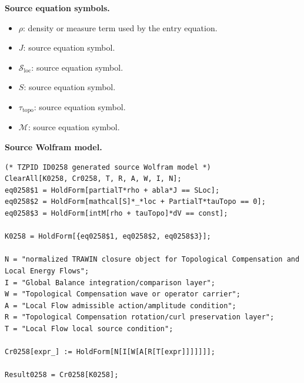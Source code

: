\begin{minipage}[t]{0.49\linewidth}
\begingroup
\small
\raggedright
\textbf{Source equation symbols.}\par
\begin{itemize}[leftmargin=1.35em,itemsep=1pt,topsep=1pt,parsep=0pt]
    \item $\rho$: density or measure term used by the entry equation.
    \item $J$: source equation symbol.
    \item $\mathcal{S}_{\mathrm{loc}}$: source equation symbol.
    \item $S$: source equation symbol.
    \item $\tau_{\mathrm{topo}}$: source equation symbol.
    \item $\mathcal{M}$: source equation symbol.
\end{itemize}
\endgroup
\end{minipage}\hfill
\begin{minipage}[t]{0.47\linewidth}
\begingroup
\scriptsize
\raggedright
\textbf{Source Wolfram model.}\par
\begin{Verbatim}[fontsize=\tiny,breaklines=true,breakanywhere=true]
(* TZPID ID0258 generated source Wolfram model *)
ClearAll[K0258, Cr0258, T, R, A, W, I, N];
eq0258$1 = HoldForm[partialT*rho + abla*J == SLoc];
eq0258$2 = HoldForm[mathcal[S]*_*loc + PartialT*tauTopo == 0];
eq0258$3 = HoldForm[intM[rho + tauTopo]*dV == const];

K0258 = HoldForm[{eq0258$1, eq0258$2, eq0258$3}];

N = "normalized TRAWIN closure object for Topological Compensation and Local Energy Flows";
I = "Global Balance integration/comparison layer";
W = "Topological Compensation wave or operator carrier";
A = "Local Flow admissible action/amplitude condition";
R = "Topological Compensation rotation/curl preservation layer";
T = "Local Flow local source condition";

Cr0258[expr_] := HoldForm[N[I[W[A[R[T[expr]]]]]]];

Result0258 = Cr0258[K0258];
\end{Verbatim}
\endgroup
\end{minipage}

